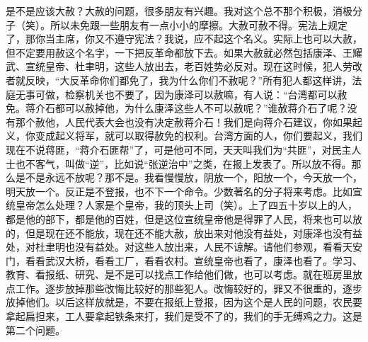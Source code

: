 是不是应该大赦？大赦的问题，很多朋友有兴趣。我对这个总不那个积极，消极分子（笑）。所以未免跟一些朋友有一点小小的摩擦。大赦可赦不得。宪法上规定了，那你当主席，你又不遵守宪法？我说，应不起这个名义。实际上也可以大赦，但不定要用赦这个名字，一下把反革命都放下去。如果大赦就必然包括康泽、王耀武、宣统皇帝、杜聿明，这些人放出去，老百姓势必反对。现在这时候，犯人劳改者就反映，“大反革命你们都免了，我为什么你们不赦呢？”所有犯人都这样讲，法庭无事可做，检察机关也不要了，因为康泽可以赦嘛，有人说：“台湾都可以赦免。蒋介石都可以赦掉他，为什么康泽这些人不可以赦呢？”谁赦蒋介石了呢？没有那个赦他，人民代表大会也没有决定赦蒋介石！我们是向蒋介石建议，你如果起义，你变成起义将军，就可以取得赦免的权利。台湾方面的人，你们要起义，我们现在不说蒋匪，“蒋介石匪帮”了，可是他可不同，天天叫我们为“共匪”，对民主人士也不客气，叫做“逆”，比如说“张逆治中”之类，在报上发表了。所以放不得。那么是不是永远不放呢？那不是。我看慢慢放，阴放一个，阳放一个，今天放一个，明天放一个。反正是不登报，也不下一个命令。少数著名的分子将来考虑。比如宣统皇帝怎么处理？人家是个皇帝，我的顶头上司（笑）。上了四五十岁以上的人，都是他的部下，都是他的百姓，但是这位宣统皇帝他是得罪了人民，将来也可以放的，但是现在还不能放，现在还不能大赦，放出来对他没有益处，对康泽也没有益处，对杜聿明也没有益处。对这些人放出来，人民不谅解。请他们参观，看看天安门，看看武汉大桥，看看工厂，看看农村。宣统皇帝也看了，康泽也看了。学习、教育、看报纸、研究、是不是可以找点工作给他们做，也可以考虑。就在班房里放点工作。逐步放掉那些改悔比较好的那些犯人。改悔较好的，罪又不很重的，逐步放掉他们。以后这样放就是，不要在报纸上登报，因为这个是人民的问题，农民要拿起扁担来，工人要拿起铁条来打，我们是受不了的，我们的手无缚鸡之力。这是第二个问题。

